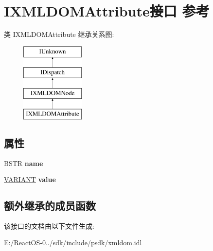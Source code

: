 \hypertarget{interface_i_x_m_l_d_o_m_attribute}{}\section{I\+X\+M\+L\+D\+O\+M\+Attribute接口 参考}
\label{interface_i_x_m_l_d_o_m_attribute}
类 I\+X\+M\+L\+D\+O\+M\+Attribute 继承关系图\+:\begin{figure}[H]
\begin{center}
\leavevmode
\includegraphics[height=4.000000cm]{interface_i_x_m_l_d_o_m_attribute}
\end{center}
\end{figure}
\subsection*{属性}
\begin{DoxyCompactItemize}
\item 
\mbox{\label{interface_i_x_m_l_d_o_m_attribute_aea23be01fc9163566ec8bfc940976b26}} 
B\+S\+TR {\bfseries name}
\item 
\mbox{\label{interface_i_x_m_l_d_o_m_attribute_a375af3d0d9484a10b99f391207574748}} 
\hyperlink{structtag_v_a_r_i_a_n_t}{V\+A\+R\+I\+A\+NT} {\bfseries value}
\end{DoxyCompactItemize}
\subsection*{额外继承的成员函数}


该接口的文档由以下文件生成\+:\begin{DoxyCompactItemize}
\item 
E\+:/\+React\+O\+S-\/0../sdk/include/psdk/xmldom.\+idl\end{DoxyCompactItemize}
